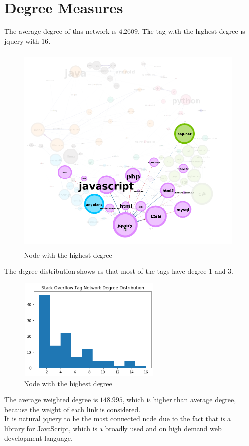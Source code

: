 \documentclass[12pt]{article}
\begin{document}
    \section{Degree Measures}
    	The average degree of this network is $4.2609$. The tag with the highest degree is jquery with $16$. 
   	 	\begin{figure}[ht]
    		\centering
    		\includegraphics[width=15cm,height=10.5cm]{highestdegree}
    		\caption{Node with the highest degree}
    	\end{figure}
		 \FloatBarrier
	    The degree distribution shows us that most of the tags have degree $1$ and $3$.
	        \begin{figure}[ht]
		    	\centering
		    	\includegraphics[width=7cm,height=5cm]{degreedistr}
		    	\caption{Node with the highest degree}
		    \end{figure}
		\FloatBarrier
		The average weighted degree is $148.995$, which is higher than average degree, because the weight of each link is considered. \\
		It is natural jquery to be the most connected node due to the fact that is a library for JavaScript, which is a broadly used and on high demand web development language. 
	
\end{document}
